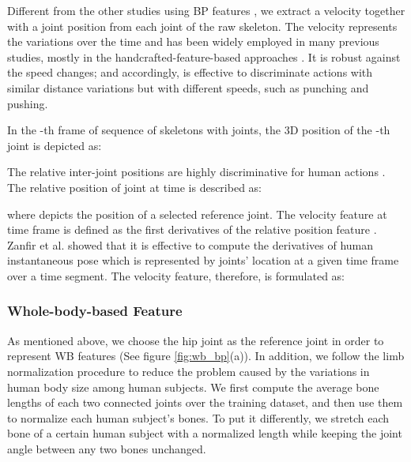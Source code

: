 \documentclass{bmvc2k}
\begin{document}
 Different from the other studies using BP features \cite{shahroudy2016ntu, liu2016spatio, ke2017skeletonnet}, we extract a velocity together with a joint position from each joint of the raw skeleton. The velocity represents the variations over the time and has been widely employed in many previous studies, mostly in the handcrafted-feature-based approaches \cite{zanfir2013moving, kerola2016graph, zhang2017geometric}. It is robust against the speed changes; and accordingly, is effective to discriminate actions with similar distance variations but with different speeds, such as punching and pushing.
 
 In the -th frame of sequence of skeletons with  joints, the 3D position of the -th joint is depicted as:
 
 The relative inter-joint positions are highly discriminative for human actions \cite{luo2013group}. The relative position of joint  at time  is described as:
 
 where  depicts the position of a selected reference joint. The velocity feature  at time frame  is defined as the first derivatives of the relative position feature . Zanfir et al.  \cite{zanfir2013moving} showed that it is effective to compute the derivatives of human instantaneous pose which is represented by joints' location at a given time frame  over a time segment. The velocity feature, therefore, is formulated as:
 
 
\subsubsection{Whole-body-based Feature}

As mentioned above, we choose the hip joint as the reference joint in order to represent WB features (See figure \ref{fig:wb_bp}(a)). In addition, we follow the limb normalization procedure \cite{zanfir2013moving} to reduce the problem caused by the variations in human body size among human subjects. We first compute the average bone lengths of each two connected joints over the training dataset, and then use them to normalize each human subject's bones. To put it differently, we stretch each bone of a certain human subject with a normalized length while keeping the joint angle between any two bones unchanged.
\end{document}
